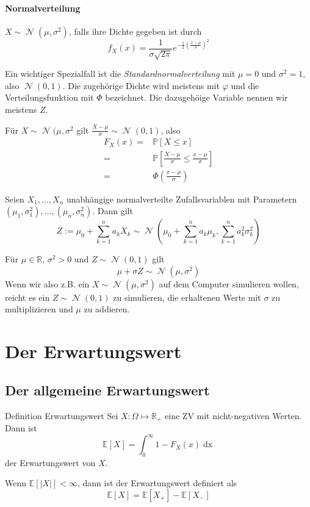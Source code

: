 \documentclass[a4paper,10pt]{article}
\def\R{\mathbb{R}}
\def\P{\mathbb{P}}
\def\E{\mathbb{E}}
\DeclareMathOperator{\Normal}{\mathcal{N}}
\begin{document}
\paragraph{Normalverteilung} \( X \sim \Normal(\mu, \sigma^2) \), falls ihre Dichte gegeben ist durch
\[ f_X(x) = \frac{1}{\sigma \sqrt{2 \pi}} e^{-\frac{1}{2} \left( \frac{x - \mu}{\sigma} \right)^2} \]

Ein wichtiger Spezialfall ist die \emph{Standardnormalverteilung} mit \( \mu = 0 \) und \( \sigma^2 = 1 \), also \( \Normal(0, 1) \).
Die zugehörige Dichte wird meistens mit \( \varphi \) und die Verteilungsfunktion mit \( \Phi \) bezeichnet. Die dazugehöige Variable nennen wir meistens \( Z \).

\begin{subbox}{}
    Für \( X \sim \Normal(\mu, \sigma^2 \) gilt \( \frac{X - \mu}{\sigma} \sim \Normal(0, 1) \), also
    \begin{align*}
        F_X(x) = &\P[X \leq x] \\
        =\ &\P \left[\frac{X - \mu}{\sigma} \leq \frac{x - \mu}{\sigma} \right] \\
        =\ &\Phi \left( \frac{x - \mu}{\sigma} \right)
    \end{align*}
\end{subbox}

Seien \( X_1, \dots, X_n \) unabhängige normalverteilte Zufallsvariablen mit Parametern \( (\mu_1, \sigma_1^2), \dots, (\mu_n, \sigma_n^2) \). Dann gilt
\[ Z := \mu_0 + \sum_{k = 1}^n a_k X_k \sim \Normal \left( \mu_0 + \sum_{k = 1}^n a_k \mu_k, \sum_{k = 1}^n a_k^2 \sigma_k^2 \right) \]

Für \( \mu \in \R \), \( \sigma^2 > 0 \) und \( Z \sim \Normal(0, 1) \) gilt
\[ \mu + \sigma Z \sim \Normal(\mu, \sigma^2) \]
Wenn wir also z.B. ein \( X \sim \Normal(\mu, \sigma^2) \) auf dem Computer simulieren wollen, reicht es ein \( Z \sim \Normal(0, 1) \) zu simulieren, die erhaltenen Werte mit  \( \sigma \) zu multiplizieren und \( \mu \) zu addieren.


\section{Der Erwartungswert}

\subsection{Der allgemeine Erwartungswert}

\begin{mainbox}{Definition Erwartungswert}
	Sei \(X: \Omega \mapsto \R_+\) eine ZV mit nicht-negativen Werten. Dann ist
	\[\E[X] = \int_0^\infty 1- F_X(x) \mathop{dx}\]
	der Erwartungswert von \(X\).
\end{mainbox}
Wenn \(\E[|X|] < \infty\), dann ist der Erwartungswert definiert als
\[\E[X] = \E[X_+] - \E[X_-]\]
\end{document}
